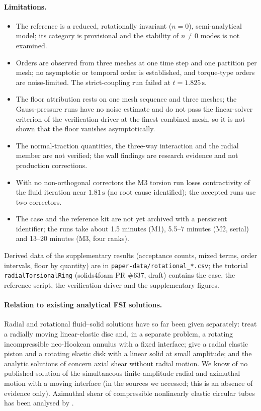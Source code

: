 \paragraph{Limitations.}
\begin{itemize}
	\item The reference is a reduced, rotationally invariant ($n=0$), semi-analytical model; its category is provisional and the stability of $n\neq0$ modes is not examined.
	\item Orders are observed from three meshes at one time step and one partition per mesh; no asymptotic or temporal order is established, and torque-type orders are noise-limited. The strict-coupling run failed at $t=1.825\,\mathrm{s}$.
	\item The floor attribution rests on one mesh sequence and three meshes; the Gauss-pressure runs have no noise estimate and do not pass the linear-solver criterion of the verification driver at the finest combined mesh, so it is not shown that the floor vanishes asymptotically.
	\item The normal-traction quantities, the three-way interaction and the radial member are not verified; the wall findings are research evidence and not production corrections.
	\item With no non-orthogonal correctors the M3 torsion run loses contractivity of the fluid iteration near $1.81\,\mathrm{s}$ (no root cause identified); the accepted runs use two correctors.
	\item The case and the reference kit are not yet archived with a persistent identifier; the runs take about 1.5 minutes (M1), 5.5--7 minutes (M2, serial) and 13--20 minutes (M3, four ranks).
\end{itemize}
Derived data of the supplementary results (acceptance counts, mixed terms, order intervals, floor by quantity) are in \texttt{paper-data/rotational\_*.csv}; the tutorial \texttt{radialTorsionalRing} (solids4foam PR \#637, draft) contains the case, the reference script, the verification driver and the supplementary figures.

\paragraph{Relation to existing analytical FSI solutions.}
Radial and rotational fluid--solid solutions have so far been given separately: \citet{WangPironneau2026} treat a radially moving linear-elastic disc and, in a separate problem, a rotating incompressible neo-Hookean annulus with a fixed interface; \citet{Serino2019} give a radial elastic piston and a rotating elastic disk with a linear solid at small amplitude; and the analytic solutions of \citet{Hessenthaler2020} concern axial shear without radial motion.
We know of no published solution of the simultaneous finite-amplitude radial and azimuthal motion with a moving interface (in the sources we accessed; this is an absence of evidence only).
Azimuthal shear of compressible nonlinearly elastic circular tubes has been analysed by \citet{Polignone1994}.
